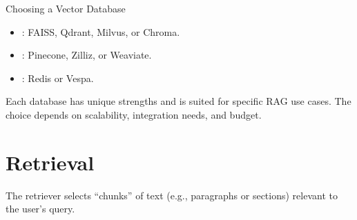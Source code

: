 \documentclass[letterpaper,11pt,english]{sphinxmanual}
\begin{document}
\sphinxAtStartPar
Choosing a Vector Database
\begin{itemize}
\item {} 
\sphinxAtStartPar
{}: FAISS, Qdrant, Milvus, or Chroma.

\item {} 
\sphinxAtStartPar
{}: Pinecone, Zilliz, or Weaviate.

\item {} 
\sphinxAtStartPar
{}: Redis or Vespa.

\end{itemize}

\sphinxAtStartPar
Each database has unique strengths and is suited for specific RAG use cases. The choice depends on scalability, integration needs, and budget.


\section{Retrieval}
\label{\detokenize{rag:retrieval}}
\sphinxAtStartPar
The retriever selects “chunks” of text (e.g., paragraphs or sections) relevant to the user’s query.

\begin{figure}[htbp]
\centering

\noindent{}
\end{figure}
\end{document}
